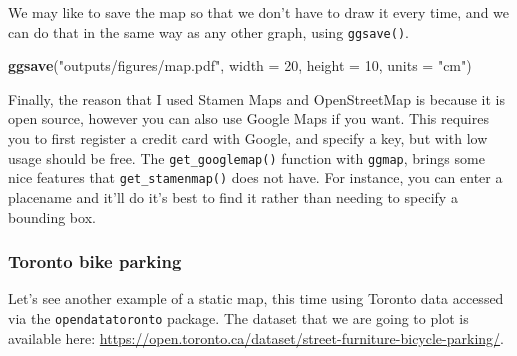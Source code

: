 \documentclass[
]{book}
\newenvironment{Shaded}{\begin{snugshade}}{\end{snugshade}}
\newcommand{\CommentTok}[1]{\textcolor[rgb]{0.56,0.35,0.01}{\textit{#1}}}
\newcommand{\DataTypeTok}[1]{\textcolor[rgb]{0.13,0.29,0.53}{#1}}
\newcommand{\DecValTok}[1]{\textcolor[rgb]{0.00,0.00,0.81}{#1}}
\newcommand{\KeywordTok}[1]{\textcolor[rgb]{0.13,0.29,0.53}{\textbf{#1}}}
\newcommand{\NormalTok}[1]{#1}
\newcommand{\OperatorTok}[1]{\textcolor[rgb]{0.81,0.36,0.00}{\textbf{#1}}}
\newcommand{\StringTok}[1]{\textcolor[rgb]{0.31,0.60,0.02}{#1}}
\begin{document}
We may like to save the map so that we don't have to draw it every time, and we can do that in the same way as any other graph, using \texttt{ggsave()}.

\begin{Shaded}
\begin{Highlighting}[]
\KeywordTok{ggsave}\NormalTok{(}\StringTok{"outputs/figures/map.pdf"}\NormalTok{, }\DataTypeTok{width =} \DecValTok{20}\NormalTok{, }\DataTypeTok{height =} \DecValTok{10}\NormalTok{, }\DataTypeTok{units =} \StringTok{"cm"}\NormalTok{)}
\end{Highlighting}
\end{Shaded}

Finally, the reason that I used Stamen Maps and OpenStreetMap is because it is open source, however you can also use Google Maps if you want. This requires you to first register a credit card with Google, and specify a key, but with low usage should be free. The \texttt{get\_googlemap()} function with \texttt{ggmap}, brings some nice features that \texttt{get\_stamenmap()} does not have. For instance, you can enter a placename and it'll do it's best to find it rather than needing to specify a bounding box.

\hypertarget{toronto-bike-parking}{%
\subsubsection{Toronto bike parking}\label{toronto-bike-parking}}

Let's see another example of a static map, this time using Toronto data accessed via the \texttt{opendatatoronto} package. The dataset that we are going to plot is available here: \url{https://open.toronto.ca/dataset/street-furniture-bicycle-parking/}.

\begin{Shaded}
\end{Shaded}
\end{document}
